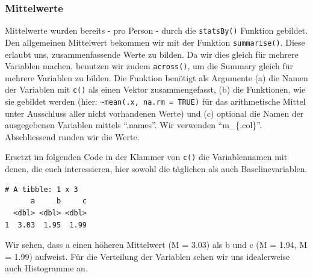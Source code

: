 \documentclass[
  letterpaper,
  DIV=11,
  numbers=noendperiod]{scrreprt}
\newenvironment{Shaded}{\begin{snugshade}}{\end{snugshade}}
\newcommand{\AttributeTok}[1]{\textcolor[rgb]{0.40,0.45,0.13}{#1}}
\newcommand{\ConstantTok}[1]{\textcolor[rgb]{0.56,0.35,0.01}{#1}}
\newcommand{\FunctionTok}[1]{\textcolor[rgb]{0.28,0.35,0.67}{#1}}
\newcommand{\NormalTok}[1]{\textcolor[rgb]{0.00,0.23,0.31}{#1}}
\newcommand{\OtherTok}[1]{\textcolor[rgb]{0.00,0.23,0.31}{#1}}
\newcommand{\SpecialCharTok}[1]{\textcolor[rgb]{0.37,0.37,0.37}{#1}}
\newcommand{\StringTok}[1]{\textcolor[rgb]{0.13,0.47,0.30}{#1}}
\begin{document}
\subsubsection{Mittelwerte}\label{mittelwerte}

Mittelwerte wurden bereits - pro Person - durch die \texttt{statsBy()}
Funktion gebildet. Den allgemeinen Mittelwert bekommen wir mit der
Funktion \texttt{summarise()}. Diese erlaubt uns, zusammenfassende Werte
zu bilden. Da wir dies gleich für mehrere Variablen machen, benutzen wir
zudem \texttt{across()}, um die Summary gleich für mehrere Variablen zu
bilden. Die Funktion benötigt als Argumente (a) die Namen der Variablen
mit \texttt{c()} als einen Vektor zusammengefasst, (b) die Funktionen,
wie sie gebildet werden (hier:
\texttt{\textasciitilde{}mean(.x,\ na.rm\ =\ TRUE)} für das
arithmetische Mittel unter Ausschluss aller nicht vorhandenen Werte) und
(c) optional die Namen der ausgegebenen Variablen mittels ``.names''.
Wir verwenden ``m\_\{.col\}''. Abschliessend runden wir die Werte.

Ersetzt im folgenden Code in der Klammer von \texttt{c()} die
Variablennamen mit denen, die euch interessieren, hier sowohl die
täglichen als auch Baselinevariablen.

\begin{Shaded}
\end{Shaded}

\begin{verbatim}
# A tibble: 1 x 3
      a     b     c
  <dbl> <dbl> <dbl>
1  3.03  1.95  1.99
\end{verbatim}

Wir sehen, dass a einen höheren Mittelwert (M = 3.03) als b und c (M =
1.94, M = 1.99) aufweist. Für die Verteilung der Variablen sehen wir uns
idealerweise auch Histogramme an.

\begin{Shaded}
\end{Shaded}
\end{document}

